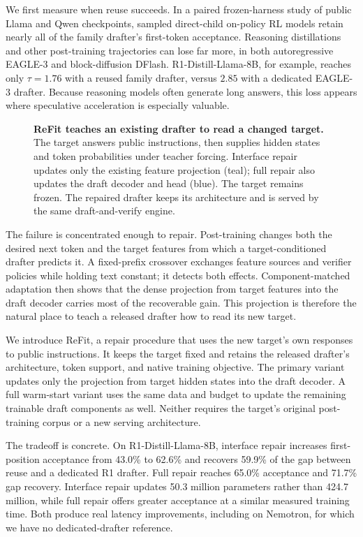 \documentclass[11pt]{article}
\newcommand{\method}{ReFit}
\begin{document}
We first measure when reuse succeeds. In a paired frozen-harness study of public Llama and Qwen checkpoints, sampled direct-child on-policy RL models retain nearly all of the family drafter's first-token acceptance. Reasoning distillations and other post-training trajectories can lose far more, in both autoregressive EAGLE-3 and block-diffusion DFlash. R1-Distill-Llama-8B, for example, reaches only $\tau=1.76$ with a reused family drafter, versus $2.85$ with a dedicated EAGLE-3 drafter. Because reasoning models often generate long answers, this loss appears where speculative acceleration is especially valuable.

\begin{figure}[t]
\centering
\resizebox{\textwidth}{!}{}
\caption{\textbf{\method{} teaches an existing drafter to read a changed target.} The target answers public instructions, then supplies hidden states and token probabilities under teacher forcing. Interface repair updates only the existing feature projection (teal); full repair also updates the draft decoder and head (blue). The target remains frozen. The repaired drafter keeps its architecture and is served by the same draft-and-verify engine.}
\label{fig:hero}
\end{figure}

The failure is concentrated enough to repair. Post-training changes both the desired next token and the target features from which a target-conditioned drafter predicts it. A fixed-prefix crossover exchanges feature sources and verifier policies while holding text constant; it detects both effects. Component-matched adaptation then shows that the dense projection from target features into the draft decoder carries most of the recoverable gain. This projection is therefore the natural place to teach a released drafter how to read its new target.

We introduce \method{}, a repair procedure that uses the new target's own responses to public instructions. It keeps the target fixed and retains the released drafter's architecture, token support, and native training objective. The primary variant updates only the projection from target hidden states into the draft decoder. A full warm-start variant uses the same data and budget to update the remaining trainable draft components as well. Neither requires the target's original post-training corpus or a new serving architecture.

The tradeoff is concrete. On R1-Distill-Llama-8B, interface repair increases first-position acceptance from 43.0\% to 62.6\% and recovers 59.9\% of the gap between reuse and a dedicated R1 drafter. Full repair reaches 65.0\% acceptance and 71.7\% gap recovery. Interface repair updates 50.3 million parameters rather than 424.7 million, while full repair offers greater acceptance at a similar measured training time. Both produce real latency improvements, including on Nemotron, for which we have no dedicated-drafter reference.
\end{document}
